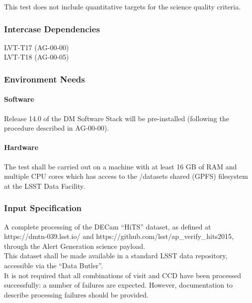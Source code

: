 This test does not include quantitative targets for the science quality
criteria.





\subsubsection{Intercase Dependencies}

LVT-T17 (AG-00-00)\\
LVT-T18 (AG-00-05)



\subsubsection{Environment Needs}

\paragraph{Software}

Release 14.0 of the DM Software Stack will be pre-installed (following
the procedure described in AG-00-00).



\paragraph{Hardware}

The test shall be carried out on a machine with at least 16 GB of RAM
and multiple CPU cores which has access to the /datasets shared (GPFS)
filesystem at the LSST Data Facility.



\subsubsection{Input Specification}

A complete processing of the DECam ``HiTS'' dataset, as defined at
https://dmtn-039.lsst.io/ and
https://github.com/lsst/ap\_verify\_hits2015, through the Alert
Generation science payload.\\
This dataset shall be made available in a standard LSST data repository,
accessible via the ``Data Butler''.\\
It is not required that all combinations of visit and CCD have been
processed successfully: a number of failures are expected. However,
documentation to describe processing failures should be provided.



